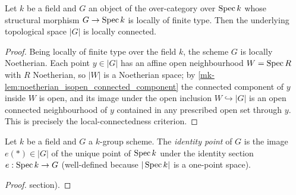 \begin{lemma}\label{mk-lem:identity_component_locally_connected}
  \leanok

  Let \(k\) be a field and \(G\) an object of the over-category over
  \(\operatorname{Spec} k\) whose structural morphism \(G \to \operatorname{Spec} k\) is locally of
  finite type. Then the underlying topological space \(|G|\) is locally
  connected.
\end{lemma}
\begin{proof}
  Being locally of finite type over the field \(k\), the scheme \(G\) is
  locally Noetherian. Each point \(y \in |G|\) has an affine open
  neighbourhood \(W = \operatorname{Spec} R\) with \(R\) Noetherian, so \(|W|\) is a
  Noetherian space; by
  \ref{mk-lem:noetherian_isopen_connected_component} the connected component
  of \(y\) inside \(W\) is open, and its image under the open inclusion
  \(W \hookrightarrow |G|\) is an open connected neighbourhood of \(y\)
  contained in any prescribed open set through \(y\). This is precisely the
  local-connectedness criterion.
\end{proof}

\begin{definition}\label{mk-def:identity_section_point}
  \leanok

  Let \(k\) be a field and \(G\) a \(k\)-group scheme. The
  \emph{identity point} of \(G\) is the image \(e(\ast) \in |G|\) of the
  unique point of \(\operatorname{Spec} k\) under the identity section
  \(e : \operatorname{Spec} k \to G\) (well-defined because \(|\operatorname{Spec} k|\) is a
  one-point space).
\end{definition}
\begin{proof}
  section).
\end{proof}

